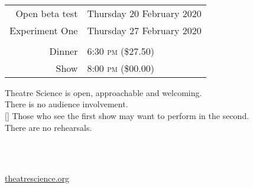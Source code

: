 \documentclass{article}
\begin{document}
  \thispagestyle{empty}

  \begin{center}

    \vspace*{2in}


    \vspace{1in}

    \\
    \vspace{0.5cm}
    \\
    \vspace{0.5cm}
    \\

    \vspace{1in}

    {\Huge


      \vspace{0.5in}

      \begin{tabular}{rl}

        Open beta test       & Thursday 20 February 2020 \\
        Experiment One  & Thursday 27 February 2020 \\
        & \\
        Dinner & 6:30 \textsc{pm} (\$27.50)\\
        Show   & 8:00 \textsc{pm} (\$00.00)

      \end{tabular}


      \vspace{1in}

      Theatre Science is open, approachable and welcoming.  \\
      There is no audience involvement.\\
      [\baselineskip]
      Those who see the first show may want to perform in the second.\\
      There are no rehearsals.

    }

    \vspace{1.5in}

    \\
    \vspace{0.2cm}
    \\

    \vspace{1in}

    {\Huge \url{theatrescience.org} \\ \ccby }

\end{center}
\end{document}
